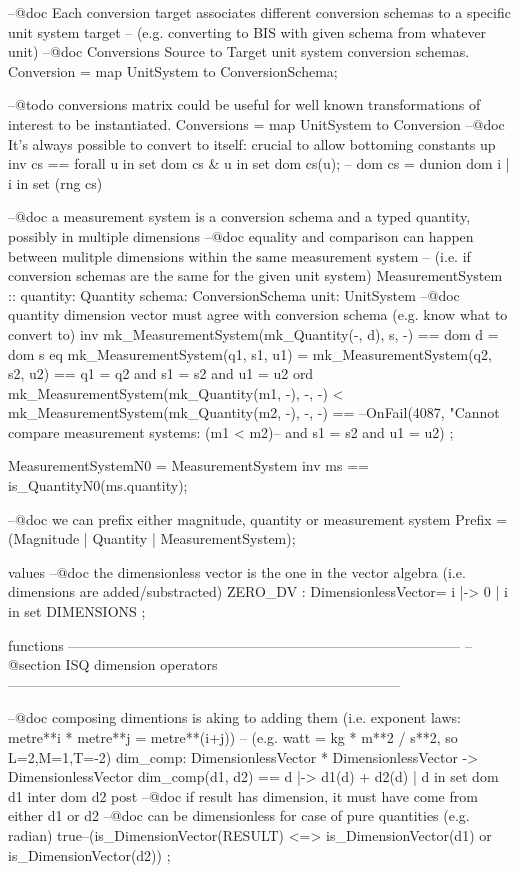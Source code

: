 \documentclass[a4paper]{article}
\begin{document}
\begin{vdm_al}
 --@doc Each conversion target associates different conversion schemas to a specific unit system target
 --    (e.g. converting to BIS with given schema from whatever unit) 
 --@doc Conversions Source to Target unit system conversion schemas.
 Conversion  = map UnitSystem to ConversionSchema;
        
 --@todo conversions matrix could be useful for well known transformations of interest to be instantiated.
 Conversions = map UnitSystem to Conversion
 --@doc It's always possible to convert to itself: crucial to allow bottoming constants up 
 inv cs == forall u in set dom cs & u in set dom cs(u); -- dom cs = dunion { dom i | i in set (rng cs) }
        
 --@doc a measurement system is a conversion schema and a typed quantity, possibly in multiple dimensions
 --@doc equality and comparison can happen between mulitple dimensions within the same measurement system
 --    (i.e. if conversion schemas are the same for the given unit system)
 MeasurementSystem ::
  quantity: Quantity
   schema: ConversionSchema
    unit: UnitSystem
  --@doc quantity dimension vector must agree with conversion schema (e.g. know what to convert to)
 inv mk_MeasurementSystem(mk_Quantity(-, d), s, -) == dom d = dom s
 eq  mk_MeasurementSystem(q1, s1, u1) 
  = 
  mk_MeasurementSystem(q2, s2, u2) 
  ==
  q1 = q2 and s1 = s2 and u1 = u2
 ord mk_MeasurementSystem(mk_Quantity(m1, -), -, -) 
  < 
  mk_MeasurementSystem(mk_Quantity(m2, -), -, -) 
  ==
  --OnFail(4087, "Cannot compare measurement systems: %
  (m1 < m2)-- and s1 = s2 and u1 = u2)
 ;

 MeasurementSystemN0 = MeasurementSystem
 inv ms == is_QuantityN0(ms.quantity);

 --@doc we can prefix either magnitude, quantity or measurement system
 Prefix = (Magnitude | Quantity | MeasurementSystem);

values
 --@doc the dimensionless vector is the one in the vector algebra (i.e. dimensions are added/substracted)
 ZERO_DV   : DimensionlessVector= { i |-> 0 | i in set DIMENSIONS };
        
functions   
------------------------------------------------------------------------------------
--@section ISQ dimension operators
------------------------------------------------------------------------------------

 --@doc composing dimentions is aking to adding them (i.e. exponent laws: metre**i * metre**j = metre**(i+j))
 --   (e.g. watt = kg * m**2 / s**2, so L=2,M=1,T=-2)
 dim_comp: DimensionlessVector * DimensionlessVector -> DimensionlessVector
 dim_comp(d1, d2) == { d |-> d1(d) + d2(d) | d in set dom d1 inter dom d2 }
 post 
  --@doc if result has dimension, it must have come from either d1 or d2
  --@doc can be dimensionless for case of pure quantities (e.g. radian)
  true--(is_DimensionVector(RESULT) <=> is_DimensionVector(d1) or is_DimensionVector(d2))
  ;
            

\end{vdm_al}
\end{document}

